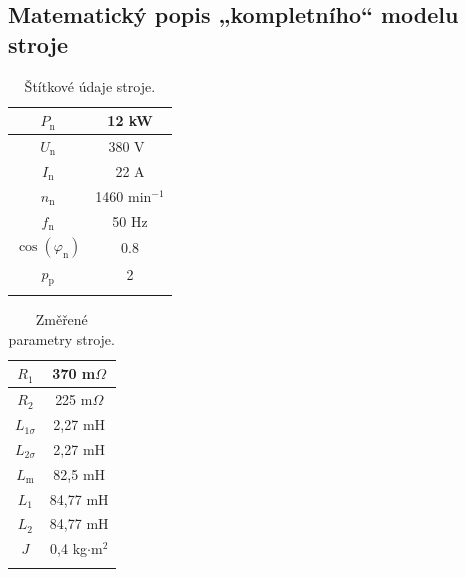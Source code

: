 \documentclass[a4paper, twoside, 11pt]{article}
\begin{document}
	\subsection{Matematický popis „kompletního“ modelu stroje}\label{subsec:matematicky-popis-kompletniho-modelu-stroje}
	\begin{minipage}[t]{0.47\textwidth}
        \vspace{\baselineskip}
        \begin{table}[H]
            \caption{Štítkové údaje stroje.}
            \centering
                \begin{tabular}{!{\vrule width 2pt} c | c !{\vrule width 2pt}}
                    $P_\text{n}$ & 12 kW \\ \hline
                    $U_\text{n}$ & 380 V~\\ \hline
                    $I_\text{n}$ & 22 A\\ \hline
                    $n_\text{n}$ & 1460 min$^{-1}$ \\ \hline
                    $f_\text{n}$ & 50 Hz \\ \hline
                    $\cos(\varphi_\text{n})$ &  0.8 \\ \hline
                    $p_\text{p}$ & 2 \\ 
                \end{tabular}     
            \label{tab:stitkove-udaje}
        \end{table}
        \end{minipage}%
        \hfill
        \begin{minipage}[t]{0.47\textwidth}
            \vspace{0pt}
            \begin{table}[H]
                \caption{Změřené parametry stroje.}
                \centering
                    \begin{tabular}{!{\vrule width 2pt} c | c !{\vrule width 2pt}}
                        $R_\text{1}$ & 370 m$\Omega$ \\ \hline
                        $R_\text{2}$ & 225 m$\Omega$ \\ \hline
                        $L_{1\sigma}$ & 2,27 mH \\ \hline
                        $L_{2\sigma}$ & 2,27 mH \\ \hline
                        $L_\text{m}$ & 82,5 mH \\ \hline
                        $L_{1}$ & 84,77 mH \\ \hline
                        $L_{2}$ & 84,77 mH \\ \hline $J$ & 0,4 kg$\cdot$m$^{2}$ \\ 
                    \end{tabular}     
                \label{tab:zmerene-parametry-stroje}
            \end{table}
        \end{minipage}
\end{document}
